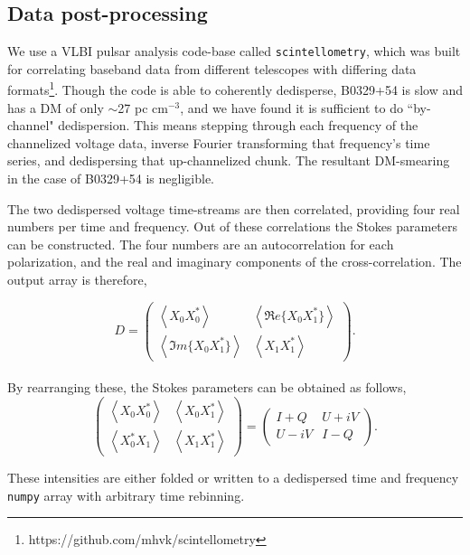 \subsection{Data post-processing}
\label{sec-b0329analysis}

We use a VLBI pulsar analysis code-base called 
{\tt scintellometry}, which was built for 
correlating baseband data from different telescopes 
with differing data formats\footnote{https://github.com/mhvk/scintellometry}. 
Though the code is able to coherently dedisperse, 
B0329+54 is slow and has a DM of only 
$\sim$27 pc cm$^{-3}$, and we have found it is sufficient to do ``by-channel" 
dedispersion. This means stepping through each frequency 
of the channelized voltage data, inverse Fourier transforming 
that frequency's time series, and dedispersing that up-channelized 
chunk. The resultant DM-smearing in the case of 
B0329+54 is negligible. 

The two dedispersed voltage time-streams are then correlated, 
providing four real numbers per time and frequency. 
Out of these correlations the Stokes parameters 
can be constructed. The four numbers are an autocorrelation for each 
polarization, and the real and imaginary components of the
cross-correlation. The output array is therefore,

\begin{equation}
D = \begin{pmatrix}
\left< X_0X_0^*\right> & \left< \Re e\{X_0X_1^*\}\right >\\ 
 \left< \Im m\{X_0X_1^*\}\right > & \left< X_1X_1^*\right>
\end{pmatrix}.
\end{equation}
\\
\noindent By rearranging these, the Stokes parameters can 
be obtained as follows,
\\
\begin{equation}
\begin{pmatrix}
\left< X_0X_0^*\right> & \left< X_0X_1^*\right >\\ 
 \left< X_0^*X_1 \right > & \left< X_1X_1^*\right>
\end{pmatrix} = 
\begin{pmatrix}
I + Q & U + iV\\ 
U -iV & I - Q
\end{pmatrix}.
\end{equation}


\noindent These intensities are either folded 
or written to a dedispersed time and frequency {\tt numpy} 
array with arbitrary time rebinning. 

